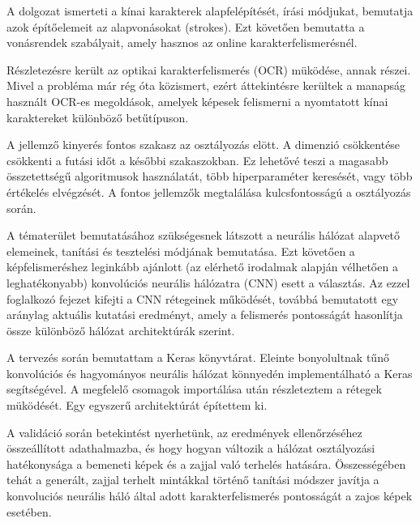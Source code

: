 
A dolgozat ismerteti a kínai karakterek alapfelépítését, írási módjukat, bemutatja azok építőelemeit az alapvonásokat (strokes). Ezt követően bemutatta a vonásrendek szabályait, amely hasznos az online karakterfelismerésnél.

Részletezésre került az optikai karakterfelismerés (OCR) müködése, annak részei. Mivel a probléma már rég óta közismert, ezért áttekintésre kerültek a manapság használt OCR-es megoldások, amelyek képesek felismerni a nyomtatott kínai karaktereket különböző betűtípuson.

A jellemző kinyerés fontos szakasz az osztályozás elött. A dimenzió csökkentése csökkenti a futási időt a későbbi szakaszokban. Ez lehetővé teszi a magasabb összetettségű algoritmusok használatát, több hiperparaméter keresését, vagy több értékelés elvégzését. A fontos jellemzők megtalálása kulcsfontosságú a osztályozás során.

A tématerület bemutatásához szükségesnek látszott a neurális hálózat alapvető elemeinek, tanítási és tesztelési módjának bemutatása. Ezt követően a képfelismeréshez leginkább ajánlott (az elérhető irodalmak alapján vélhetően a leghatékonyabb) konvolúciós neurális hálózatra (CNN) esett a választás. Az ezzel foglalkozó fejezet kifejti a CNN rétegeinek működését, továbbá bemutatott egy aránylag aktuális kutatási eredményt, amely a felismerés pontosságát hasonlítja össze különböző hálózat architektúrák szerint.

A tervezés során bemutattam a Keras könyvtárat. Eleinte bonyolultnak tűnő konvolúciós és hagyományos neurális hálózat könnyedén implementálható a Keras segítségével. A megfelelő csomagok importálása után részleteztem a rétegek müködését. Egy egyszerű architektúrát építettem ki.

A validáció során betekintést nyerhetünk, az eredmények ellenőrzéséhez összeállított adathalmazba, és hogy hogyan változik a hálózat osztályozási hatékonysága a bemeneti képek és a zajjal való terhelés hatására. Összességében tehát a generált, zajjal terhelt mintákkal történő tanítási módszer javítja a konvoluciós neurális háló által adott karakterfelismerés pontosságát a zajos képek esetében.
